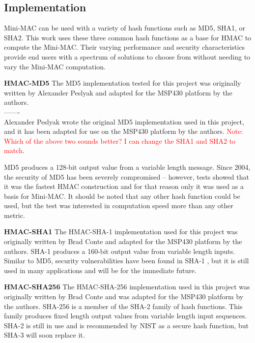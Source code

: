 \subsection{Implementation}
Mini-MAC can be used with a variety of hash functions such as MD5, SHA1, or SHA2. This work uses these three common hash functions as a base for HMAC to compute the Mini-MAC. Their varying performance and security characteristics provide end users with a spectrum of solutions to choose from without needing to vary the Mini-MAC computation.

\textbf{HMAC-MD5}
The MD5 implementation tested for this project was originally written by Alexander Peslyak \cite{Peslyak} and adapted for the MSP430 platform by the authors. \\-------\\
Alexander Peslyak \cite{Peslyak} wrote the original MD5 implementation used in this project, and it has been adapted for use on the MSP430 platform by the authors. 
\textcolor{red}{Note: Which of the above two sounds better? I can change the SHA1 and SHA2 to match}.

MD5 produces a 128-bit output value from a variable length message. Since 2004, the security of MD5 has been severely compromised \cite{Wang-MD5} -- however, tests showed that it was the fastest HMAC construction and for that reason only it was used as a basis for Mini-MAC. It should be noted that any other hash function could be used, but the test was interested in computation speed more than any other metric\cite{MD5}.

\textbf{HMAC-SHA1}
The HMAC-SHA-1 implementation used for this project was originally written by Brad Conte \cite{Conte-SHA1} and adapted for the MSP430 platform by the authors. SHA-1 produces a 160-bit output value from variable length inputs. Similar to MD5, security vulnerabilities have been found in SHA-1 \cite{Wang-SHA1}, but it is still used in many applications and will be for the immediate future\cite{FIPS-180-4}.

\textbf{HMAC-SHA256}
The HMAC-SHA-256 implementation used in this project was originally written by Brad Conte \cite{Conte-SHA256} and was adapted for the MSP430 platform by the authors. SHA-256 is a member of the SHA-2 family of hash functions. This family produces fixed length output values from variable length input sequences. SHA-2 is still in use and is recommended by NIST as a secure hash function, but SHA-3 will soon replace it\cite{FIPS-180-4}.